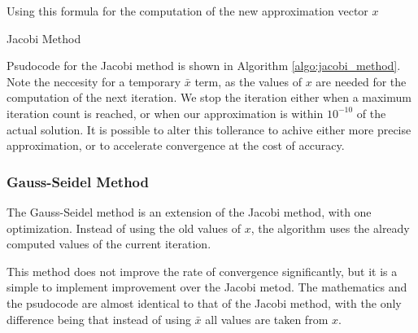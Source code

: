 \documentclass[../fem.tex]{subfiles}
\begin{document}
Using this formula for the computation of the new approximation vector $x$

\begin{algorithm}[H]
  \caption{Jacobi Method}\label{algo:jacobi_method}
  \begin{algorithmic}
    \EndFor
    \EndFor
    \EndIf
    \EndFor
  \end{algorithmic}
\end{algorithm}

Psudocode for the Jacobi method is shown in Algorithm \ref{algo:jacobi_method}.
Note the neccesity for a temporary $\bar{x}$ term, as the values of $x$ are
needed for the computation of the next iteration. We stop the iteration either
when a maximum iteration count is reached, or when our approximation is within
$10^{-10}$ of the actual solution. It is possible to alter this tollerance to
achive either more precise approximation, or to accelerate convergence at the
cost of accuracy.


\subsubsection{Gauss-Seidel Method}%
\label{ssub:gauss_seidel_method}

The Gauss-Seidel method is an extension of the Jacobi method, with one
optimization. Instead of using the old values of $x$, the algorithm uses the
already computed values of the current iteration.

\begin{Figure}
   \begin{center}
     
   \end{center}
   \label{fig:gs_time}
\end{Figure}

This method does not improve the rate of convergence significantly, but it is a
simple to implement improvement over the Jacobi metod. The mathematics and the
psudocode are almost identical to that of the Jacobi method, with the only
difference being that instead of using $\bar{x}$ all values are taken from $x$.
\end{document}
